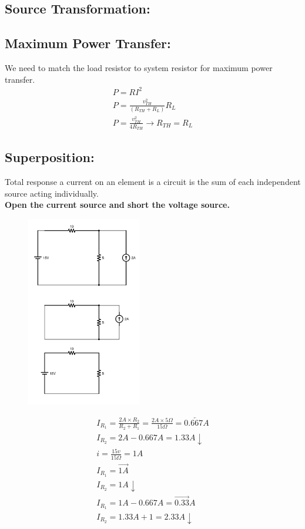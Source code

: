 \documentclass[a4paper,12]{article}
\begin{document}
\subsection{Source Transformation:}



\subsection{Maximum Power Transfer:}
We need to match the load resistor to system resistor for maximum power transfer.
\begin{gather}
    P=RI^2\\
    P=\frac{v_{TH}^2}{(R_{TH}+R_L)}R_L\\
    P=\frac{v_{TH}^2}{4R_{TH}}\rightarrow R_{TH}=R_L
\end{gather}
\subsection{Superposition:}
Total response a current on an element is a circuit is the sum of each independent source acting individually.\\
\textbf{Open the current source and short the voltage source.}
\begin{figure}[H]
    \centering
    \includegraphics[width=50mm]{Image/21.jpg}
\end{figure}
\begin{gather}
    I_{R_1}=\frac{2A\times R_2}{R_2+R_1}=\frac{2A\times 5\Omega}{15\Omega}=\overleftarrow{0.667A}\\
    I_{R_2}=2A-0.667A=1.33A\downarrow\\
    \hline
    i=\frac{15v}{15\Omega}=1A\\
    I_{R_1}=\overrightarrow{1A}\\
    I_{R_2}=1A\downarrow\\
    I_{R_1}=1A-0.667A=\overrightarrow{0.33}A\\
    I_{R_2}=1.33A+1=2.33A\downarrow
\end{gather}
\end{document}
